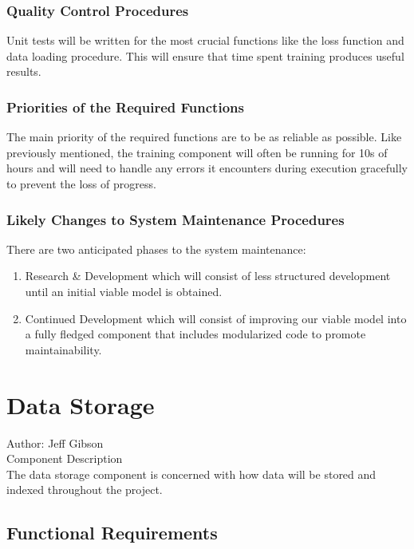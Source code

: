 \documentclass[12pt]{article}
\begin{document}
\subsubsection {Quality Control Procedures}

Unit tests will be written for the most crucial functions like the loss function and data loading procedure. This will ensure that time spent training produces useful results.

\subsubsection {Priorities of the Required Functions}

The main priority of the required functions are to be as reliable as possible. Like previously mentioned, the training component will often be running for 10s of hours and will need to handle any errors it encounters during execution gracefully to prevent the loss of progress.

\subsubsection {Likely Changes to System Maintenance Procedures}

There are two anticipated phases to the system maintenance:
\begin{enumerate}
    \item Research \& Development which will consist of less structured development until an initial viable model is obtained.
    \item Continued Development which will consist of improving our viable model into a fully fledged component that includes modularized code to promote maintainability.
\end{enumerate}

\section{Data Storage}
Author: Jeff Gibson\\

\noindent Component Description\\

The data storage component is concerned with how data will be stored and indexed throughout the project.

\subsection{Functional Requirements}
\end{document}
